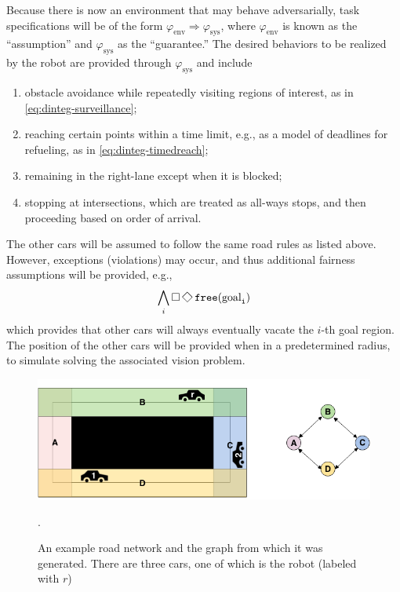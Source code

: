\documentclass{amsart}
\theoremstyle{definition}
\begin{document}
Because there is now an environment that may behave adversarially, task
specifications will be of the form $\varphi_{\mathrm{env}} \Rightarrow
\varphi_{\mathrm{sys}}$, where $\varphi_{\mathrm{env}}$ is known as the
``assumption'' and $\varphi_{\mathrm{sys}}$ as the ``guarantee.''  The desired
behaviors to be realized by the robot are provided through
$\varphi_{\mathrm{sys}}$ and include
\begin{enumerate}
\item obstacle avoidance while repeatedly visiting regions of interest, as in
  \eqref{eq:dinteg-surveillance};

\item reaching certain points within a time limit, e.g., as a model of deadlines
  for refueling, as in \eqref{eq:dinteg-timedreach};

\item remaining in the right-lane except when it is blocked;

\item stopping at intersections, which are treated as all-ways stops, and then
  proceeding based on order of arrival.
\end{enumerate}
The other cars will be assumed to follow the same road rules as listed above.
However, exceptions (violations) may occur, and thus additional fairness
assumptions will be provided, e.g.,
\begin{equation}\label{eq:freegoals}
\bigwedge_i \Galways \Feventually \tt{free}(\mathrm{goal}_i)
\end{equation}
which provides that other cars will always eventually vacate the $i$-th goal
region. The position of the other cars will be provided when in a predetermined 
radius, to simulate solving the associated vision problem. 

\begin{figure}[h!]\label{fig:network}
  \centering
        \includegraphics[width=1.0\textwidth]{images/network}
  \caption{An example road network and the graph from which it was generated. There are three cars, one of which is the robot (labeled with $r$)}.
\end{figure}
\end{document}
